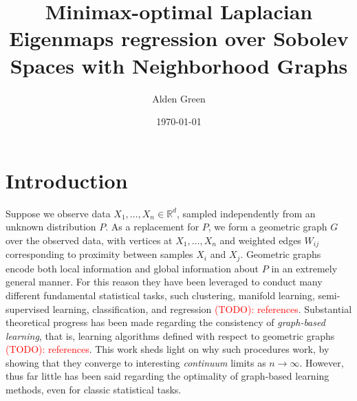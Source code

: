 \documentclass{article}
\newcommand{\Reals}{\mathbb{R}}
\newcommand{\1}{\mathbf{1}}
\theoremstyle{alden}
\theoremstyle{aldenthm}
\theoremstyle{definition}
\theoremstyle{remark}
\begin{document}
\title{Minimax-optimal Laplacian Eigenmaps regression over Sobolev Spaces with Neighborhood Graphs}
\author{Alden Green}
\date{\today}
\maketitle

\section{Introduction}
\label{sec:introduction}

Suppose we observe data $X_1,\ldots,X_n \in \Reals^d$, sampled independently from an unknown distribution $P$. As a replacement for $P$, we form a geometric graph $G$ over the observed data, with vertices at $X_1,\ldots,X_n$ and weighted edges $W_{ij}$ corresponding to proximity between samples $X_i$ and $X_j$. Geometric graphs encode both local information and global information about $P$ in an extremely general manner. For this reason they have been leveraged to conduct many different fundamental statistical tasks, such clustering, manifold learning, semi-supervised learning, classification, and regression \textcolor{red}{(TODO): references}. Substantial theoretical progress has been made regarding the consistency of \emph{graph-based learning}, that is, learning algorithms defined with respect to geometric graphs \textcolor{red}{(TODO): references}. This work sheds light on why such procedures work, by showing that they converge to interesting \emph{continuum} limits as $n \to \infty$. However, thus far little has been said regarding the optimality of graph-based learning methods, even for classic statistical tasks. 
\end{document}

